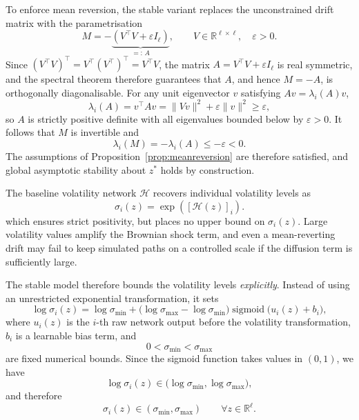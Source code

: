 \begin{description}[
    style=unboxed,
    leftmargin=0pt,
    labelindent=0pt,
    labelsep=0.5em
]
To enforce mean reversion, the stable variant replaces the unconstrained drift
matrix with the parametrisation
\[
M = -\underbrace{\left(V^\top V+\varepsilon I_\ell\right)}_{=:\,A},
\qquad
V\in\mathbb{R}^{\ell\times\ell},
\quad
\varepsilon>0.
\]
Since $(V^\top V)^\top = V^\top(V^\top)^\top = V^\top V$, the matrix
$A = V^\top V + \varepsilon I_\ell$ is real symmetric, and the spectral theorem \citep[Theorem~6.4.2]{HesselholtWahl2016}
therefore guarantees that $A$, and hence $M = -A$, is
orthogonally diagonalisable. For any unit eigenvector $v$ satisfying
$Av = \lambda_i(A) v$,
\[
\lambda_i(A) = v^\top A v = \|Vv\|^2 + \varepsilon\|v\|^2 \geq \varepsilon,
\]
so $A$ is strictly positive definite with all eigenvalues bounded below
by $\varepsilon > 0$. It follows that $M$ is invertible and
\[
\lambda_i(M) = -\lambda_i(A) \leq -\varepsilon < 0.
\]
The assumptions of Proposition~\ref{prop:meanreversion} are therefore satisfied, and global asymptotic stability about $z^*$ holds by construction.



\item[Diffusion scale.] The baseline volatility network \(\mathcal{H}\) recovers individual volatility levels as
\[
\sigma_i(z)=\exp([\mathcal{H}(z)]_i).
\]
which ensures strict positivity, but places no upper bound on \(\sigma_i(z)\). Large volatility values amplify the Brownian shock term, and even a mean-reverting drift may fail to keep simulated paths on a controlled scale if the diffusion term is sufficiently large.



The stable model therefore bounds the volatility levels \textit{explicitly}. Instead of using an unrestricted exponential transformation, it sets
\[
\log\sigma_i(z)
=
\log\sigma_{\min}
+
\bigl(\log\sigma_{\max}-\log\sigma_{\min}\bigr)
\operatorname{sigmoid}\bigl(u_i(z)+b_i\bigr),
\]
where \(u_i(z)\) is the \(i\)-th raw network output before the volatility transformation, \(b_i\) is a learnable bias term, and
\[
0<\sigma_{\min}<\sigma_{\max}
\]
are fixed numerical bounds. Since the sigmoid function takes values in \((0,1)\), we have
\[
\log\sigma_i(z)
\in
\bigl(\log\sigma_{\min},\log\sigma_{\max}\bigr),
\]
and therefore
\[
\sigma_i(z)\in(\sigma_{\min},\sigma_{\max})
\qquad
\forall z\in\mathbb{R}^{\ell}.
\]


\end{description}
